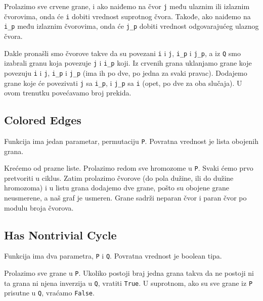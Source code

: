 Prolazimo sve crvene grane, i ako naiđemo na čvor \texttt{j} među ulaznim ili izlaznim čvorovima, onda će \texttt{i} dobiti vrednost suprotnog čvora. Takođe, ako naiđemo na \texttt{i\_p} među izlaznim čvorovima, onda će \texttt{j\_p} dobiti vrednost odgovarajućeg ulaznog čvora.

Dakle pronašli smo čvorove takve da su povezani \texttt{i} i \texttt{j}, \texttt{i\_p} i \texttt{j\_p}, a iz \texttt{Q} smo izabrali granu koja povezuje \texttt{j} i \texttt{i\_p} koji. Iz crvenih grana uklanjamo grane koje povezuju \texttt{i} i \texttt{j}, \texttt{i\_p} i \texttt{j\_p} (ima ih po dve, po jedna za svaki pravac). Dodajemo grane koje će povezivati \texttt{j} sa \texttt{i\_p}, i \texttt{j\_p} sa \texttt{i} (opet, po dve za oba slučaja). U ovom trenutku povećavamo broj prekida.







\subsection{Colored Edges}
\label{coloredEdges}

Funkcija ima jedan parametar, permutaciju \texttt{P}. Povratna vrednost je lista obojenih grana.

Krećemo od prazne liste. Prolazimo redom sve hromozome u \texttt{P}. Svaki ćemo prvo pretvoriti u ciklus. Zatim prolazimo čvorove (do pola dužine, ili do dužine hromozoma) i u listu grana dodajemo dve grane, pošto su obojene grane neusmerene, a naš graf je usmeren. Grane sadrži neparan čvor i paran čvor po modulu broja čvorova.



\subsection{Has Nontrivial Cycle}
\label{hasNontrivialCycle}

Funkcija ima dva parametra, \texttt{P} i \texttt{Q}. Povratna vrednost je boolean tipa.

Prolazimo sve grane u \texttt{P}. Ukoliko postoji braj jedna grana takva da ne postoji ni ta grana ni njena inverzija u \texttt{Q}, vratiti \texttt{True}. U suprotnom, ako su sve grane iz \texttt{P} prisutne u \texttt{Q}, vraćamo \texttt{False}.

